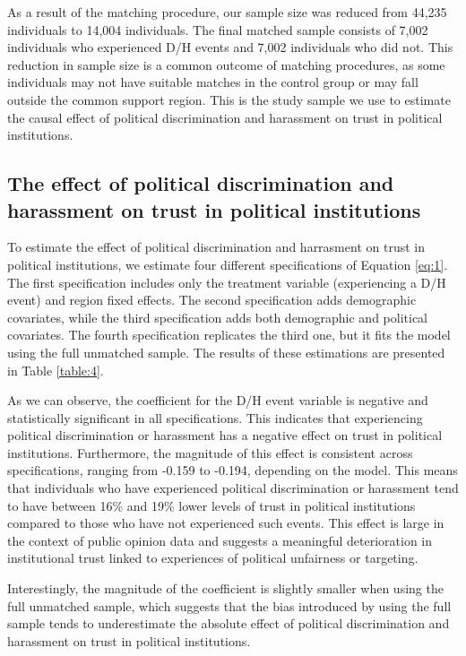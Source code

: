 \documentclass{article}
\begin{document}


As a result of the matching procedure, our sample size was reduced from 44,235 individuals to 14,004 individuals. The final matched sample consists of 7,002 individuals who experienced D/H events and 7,002 individuals who did not. This reduction in sample size is a common outcome of matching procedures, as some individuals may not have suitable matches in the control group or may fall outside the common support region. This is the study sample we use to estimate the causal effect of political discrimination and harassment on trust in political institutions.

\subsection{The effect of political discrimination and harassment on trust in political institutions}

To estimate the effect of political discrimination and harrasment on trust in political institutions, we estimate four different specifications of Equation \ref{eq:1}. The first specification includes only the treatment variable (experiencing a D/H event) and region fixed effects. The second specification adds demographic covariates, while the third specification adds both demographic and political covariates. The fourth specification replicates the third one, but it fits the model using the full unmatched sample. The results of these estimations are presented in Table \ref{table:4}.



As we can observe, the coefficient for the D/H event variable is negative and statistically significant in all specifications. This indicates that experiencing political discrimination or harassment has a negative effect on trust in political institutions. Furthermore, the magnitude of this effect is consistent across specifications, ranging from -0.159 to -0.194, depending on the model. This means that individuals who have experienced political discrimination or harassment tend to have between 16\% and 19\% lower levels of trust in political institutions compared to those who have not experienced such events. This effect is large in the context of public opinion data and suggests a meaningful deterioration in institutional trust linked to experiences of political unfairness or targeting.

Interestingly, the magnitude of the coefficient is slightly smaller when using the full unmatched sample, which suggests that the bias introduced by using the full sample tends to underestimate the absolute effect of political discrimination and harassment on trust in political institutions.
\end{document}
